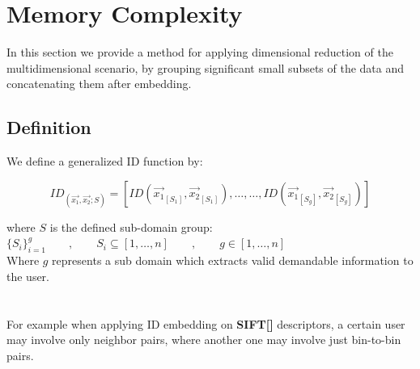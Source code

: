 
\chapter{Memory Complexity} %

\label{Chapter6} %





In this section we provide a method for applying dimensional reduction of the multidimensional scenario, by grouping significant small subsets of the data and concatenating them after embedding. 


\section{Definition}

We define a generalized ID function by:

\begin{equation}
ID_(\overrightarrow{x_1} , \overrightarrow{x_2} ; S) = [ ID(\overrightarrow{x_1}_[S_1],\overrightarrow{x_2}_[S_1]) , \dots , \dots , ID(\overrightarrow{x_1}_[S_g],\overrightarrow{x_2}_[S_g])  ]
\end{equation}

where $S$ is the defined sub-domain group: \\ 

$\{S_i\}_{i=1}^g \qquad,\qquad S_i\subseteq [1, \dots , n] \qquad , \qquad g \in [1, \dots , n]$ \\ 

Where $g$ represents a sub domain which extracts valid demandable information to the user. \\ \\ \\


For example when applying ID embedding on \textbf{SIFT[]} descriptors, a certain user may involve only neighbor pairs, where another one may involve just bin-to-bin pairs.

